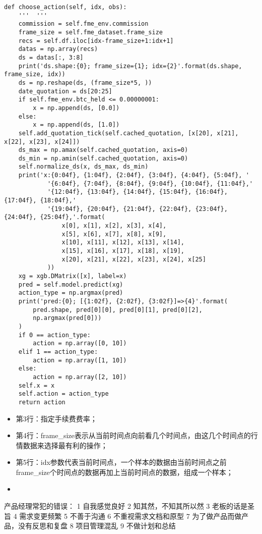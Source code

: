 \documentclass{article}
\begin{document}
\begin{lstlisting}
def choose_action(self, idx, obs):
    '''  '''
    commission = self.fme_env.commission
    frame_size = self.fme_dataset.frame_size
    recs = self.df.iloc[idx-frame_size+1:idx+1]
    datas = np.array(recs)
    ds = datas[:, 3:8]
    print('ds.shape:{0}; frame_size={1}; idx={2}'.format(ds.shape, frame_size, idx))
    ds = np.reshape(ds, (frame_size*5, ))
    date_quotation = ds[20:25]
    if self.fme_env.btc_held <= 0.00000001:
        x = np.append(ds, [0.0])
    else:
        x = np.append(ds, [1.0])
    self.add_quotation_tick(self.cached_quotation, [x[20], x[21], x[22], x[23], x[24]])
    ds_max = np.amax(self.cached_quotation, axis=0)
    ds_min = np.amin(self.cached_quotation, axis=0)
    self.normalize_ds(x, ds_max, ds_min)
    print('x:{0:04f}, {1:04f}, {2:04f}, {3:04f}, {4:04f}, {5:04f}, '
            '{6:04f}, {7:04f}, {8:04f}, {9:04f}, {10:04f}, {11:04f},'
            '{12:04f}, {13:04f}, {14:04f}, {15:04f}, {16:04f}, {17:04f}, {18:04f},'
            '{19:04f}, {20:04f}, {21:04f}, {22:04f}, {23:04f}, {24:04f}, {25:04f},'.format(
                x[0], x[1], x[2], x[3], x[4], 
                x[5], x[6], x[7], x[8], x[9],
                x[10], x[11], x[12], x[13], x[14],
                x[15], x[16], x[17], x[18], x[19],
                x[20], x[21], x[22], x[23], x[24], x[25]
            ))
    xg = xgb.DMatrix([x], label=x)
    pred = self.model.predict(xg)
    action_type = np.argmax(pred)
    print('pred:{0}; [{1:02f}, {2:02f}, {3:02f}]=>{4}'.format(
        pred.shape, pred[0][0], pred[0][1], pred[0][2],
        np.argmax(pred[0]))
    )
    if 0 == action_type:
        action = np.array([0, 10])
    elif 1 == action_type:
        action = np.array([1, 10])
    else:
        action = np.array([2, 10])
    self.x = x
    self.action = action_type
    return action
\end{lstlisting}
\begin{itemize}
\item 第3行：指定手续费费率；
\item 第4行：frame\_size表示从当前时间点向前看几个时间点，由这几个时间点的行情数据来选择最有利的操作；
\item 第5行：idx参数代表当前时间点，一个样本的数据由当前时间点之前frame\_size个时间点的数据再加上当前时间点的数据，组成一个样本；
\item 
\end{itemize}



产品经理常犯的错误：
1 自我感觉良好
2 知其然，不知其所以然
3 老板的话是圣旨
4 需求变更频繁
5 不善于沟通
6 不重视需求文档和原型
7 为了做产品而做产品，没有反思和复盘
8 项目管理混乱
9 不做计划和总结
\end{document}
